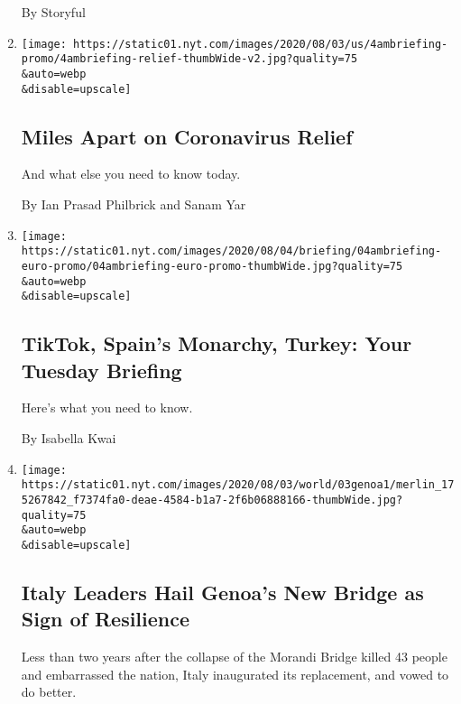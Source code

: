 \begin{enumerate}
  By Storyful
\item
  \href{/2020/08/04/briefing/coronavirus-relief-primary-elections-isaias-your-tuesday-briefing.html}{}

  \texttt{[image: https://static01.nyt.com/images/2020/08/03/us/4ambriefing-promo/4ambriefing-relief-thumbWide-v2.jpg?quality=75\\\&auto=webp\\\&disable=upscale]}

  \hypertarget{miles-apart-on-coronavirus-relief}{%
  \subsection{Miles Apart on Coronavirus
  Relief}\label{miles-apart-on-coronavirus-relief}}

  And what else you need to know today.

  By Ian Prasad Philbrick and Sanam Yar
\item
  \href{/2020/08/03/briefing/tiktok-spain-turkey.html}{}

  \texttt{[image: https://static01.nyt.com/images/2020/08/04/briefing/04ambriefing-euro-promo/04ambriefing-euro-promo-thumbWide.jpg?quality=75\\\&auto=webp\\\&disable=upscale]}

  \hypertarget{tiktok-spains-monarchy-turkey-your-tuesday-briefing}{%
  \subsection{TikTok, Spain's Monarchy, Turkey: Your Tuesday
  Briefing}\label{tiktok-spains-monarchy-turkey-your-tuesday-briefing}}

  Here's what you need to know.

  By Isabella Kwai
\item
  \href{/2020/08/03/world/europe/genoa-italy-new-bridge.html}{}

  \texttt{[image: https://static01.nyt.com/images/2020/08/03/world/03genoa1/merlin\_175267842\_f7374fa0-deae-4584-b1a7-2f6b06888166-thumbWide.jpg?quality=75\\\&auto=webp\\\&disable=upscale]}

  \hypertarget{italy-leaders-hail-genoas-new-bridge-as-sign-of-resilience}{%
  \subsection{Italy Leaders Hail Genoa's New Bridge as Sign of
  Resilience}\label{italy-leaders-hail-genoas-new-bridge-as-sign-of-resilience}}

  Less than two years after the collapse of the Morandi Bridge killed 43
  people and embarrassed the nation, Italy inaugurated its replacement,
  and vowed to do better.


\end{enumerate}
